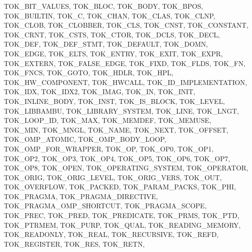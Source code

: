 T\+O\+K\+\_\+\+B\+I\+T\+\_\+\+V\+A\+L\+U\+ES, T\+O\+K\+\_\+\+B\+L\+OC, T\+O\+K\+\_\+\+B\+O\+DY, T\+O\+K\+\_\+\+B\+P\+OS, T\+O\+K\+\_\+\+B\+U\+I\+L\+T\+IN, T\+O\+K\+\_\+C, T\+O\+K\+\_\+\+C\+H\+AN, T\+O\+K\+\_\+\+C\+L\+AS, T\+O\+K\+\_\+\+C\+L\+NP, T\+O\+K\+\_\+\+C\+L\+OB, T\+O\+K\+\_\+\+C\+L\+O\+B\+B\+ER, T\+O\+K\+\_\+\+C\+LS, T\+O\+K\+\_\+\+C\+N\+ST, T\+O\+K\+\_\+\+C\+O\+N\+S\+T\+A\+NT, T\+O\+K\+\_\+\+C\+R\+NT, T\+O\+K\+\_\+\+C\+S\+TS, T\+O\+K\+\_\+\+C\+T\+OR, T\+O\+K\+\_\+\+D\+C\+LS, T\+O\+K\+\_\+\+D\+E\+CL, T\+O\+K\+\_\+\+D\+EF, T\+O\+K\+\_\+\+D\+E\+F\+\_\+\+S\+T\+MT, T\+O\+K\+\_\+\+D\+E\+F\+A\+U\+LT, T\+O\+K\+\_\+\+D\+O\+MN, T\+O\+K\+\_\+\+E\+D\+GE, T\+O\+K\+\_\+\+E\+L\+TS, T\+O\+K\+\_\+\+E\+N\+T\+RY, T\+O\+K\+\_\+\+E\+X\+IT, T\+O\+K\+\_\+\+E\+X\+PR, T\+O\+K\+\_\+\+E\+X\+T\+E\+RN, T\+O\+K\+\_\+\+F\+A\+L\+S\+E\+\_\+\+E\+D\+GE, T\+O\+K\+\_\+\+F\+I\+XD, T\+O\+K\+\_\+\+F\+L\+DS, T\+O\+K\+\_\+\+FN, T\+O\+K\+\_\+\+F\+N\+CS, T\+O\+K\+\_\+\+G\+O\+TO, T\+O\+K\+\_\+\+H\+D\+LR, T\+O\+K\+\_\+\+H\+PL, T\+O\+K\+\_\+\+H\+W\+\_\+\+C\+O\+M\+P\+O\+N\+E\+NT, T\+O\+K\+\_\+\+H\+W\+C\+A\+LL, T\+O\+K\+\_\+\+I\+D\+\_\+\+I\+M\+P\+L\+E\+M\+E\+N\+T\+A\+T\+I\+ON, T\+O\+K\+\_\+\+I\+DX, T\+O\+K\+\_\+\+I\+D\+X2, T\+O\+K\+\_\+\+I\+M\+AG, T\+O\+K\+\_\+\+IN, T\+O\+K\+\_\+\+I\+N\+IT, T\+O\+K\+\_\+\+I\+N\+L\+I\+N\+E\+\_\+\+B\+O\+DY, T\+O\+K\+\_\+\+I\+N\+ST, T\+O\+K\+\_\+\+I\+S\+\_\+\+B\+L\+O\+CK, T\+O\+K\+\_\+\+L\+E\+V\+EL, T\+O\+K\+\_\+\+L\+I\+B\+B\+A\+M\+BU, T\+O\+K\+\_\+\+L\+I\+B\+R\+A\+R\+Y\+\_\+\+S\+Y\+S\+T\+EM, T\+O\+K\+\_\+\+L\+I\+NE, T\+O\+K\+\_\+\+L\+N\+GT, T\+O\+K\+\_\+\+L\+O\+O\+P\+\_\+\+ID, T\+O\+K\+\_\+\+M\+AX, T\+O\+K\+\_\+\+M\+E\+M\+D\+EF, T\+O\+K\+\_\+\+M\+E\+M\+U\+SE, T\+O\+K\+\_\+\+M\+IN, T\+O\+K\+\_\+\+M\+N\+GL, T\+O\+K\+\_\+\+N\+A\+ME, T\+O\+K\+\_\+\+N\+E\+XT, T\+O\+K\+\_\+\+O\+F\+F\+S\+ET, T\+O\+K\+\_\+\+O\+M\+P\+\_\+\+A\+T\+O\+M\+IC, T\+O\+K\+\_\+\+O\+M\+P\+\_\+\+B\+O\+D\+Y\+\_\+\+L\+O\+OP, T\+O\+K\+\_\+\+O\+M\+P\+\_\+\+F\+O\+R\+\_\+\+W\+R\+A\+P\+P\+ER, T\+O\+K\+\_\+\+OP, T\+O\+K\+\_\+\+O\+P0, T\+O\+K\+\_\+\+O\+P1, T\+O\+K\+\_\+\+O\+P2, T\+O\+K\+\_\+\+O\+P3, T\+O\+K\+\_\+\+O\+P4, T\+O\+K\+\_\+\+O\+P5, T\+O\+K\+\_\+\+O\+P6, T\+O\+K\+\_\+\+O\+P7, T\+O\+K\+\_\+\+O\+P8, T\+O\+K\+\_\+\+O\+P\+EN, T\+O\+K\+\_\+\+O\+P\+E\+R\+A\+T\+I\+N\+G\+\_\+\+S\+Y\+S\+T\+EM, T\+O\+K\+\_\+\+O\+P\+E\+R\+A\+T\+OR, T\+O\+K\+\_\+\+O\+R\+IG, T\+O\+K\+\_\+\+O\+R\+I\+G\+\_\+\+L\+E\+V\+EL, T\+O\+K\+\_\+\+O\+R\+I\+G\+\_\+\+V\+E\+RS, T\+O\+K\+\_\+\+O\+UT, T\+O\+K\+\_\+\+O\+V\+E\+R\+F\+L\+OW, T\+O\+K\+\_\+\+P\+A\+C\+K\+ED, T\+O\+K\+\_\+\+P\+A\+R\+A\+M\+\_\+\+P\+A\+C\+KS, T\+O\+K\+\_\+\+P\+HI, T\+O\+K\+\_\+\+P\+R\+A\+G\+MA, T\+O\+K\+\_\+\+P\+R\+A\+G\+M\+A\+\_\+\+D\+I\+R\+E\+C\+T\+I\+VE, T\+O\+K\+\_\+\+P\+R\+A\+G\+M\+A\+\_\+\+O\+M\+P\+\_\+\+S\+H\+O\+R\+T\+C\+UT, T\+O\+K\+\_\+\+P\+R\+A\+G\+M\+A\+\_\+\+S\+C\+O\+PE, T\+O\+K\+\_\+\+P\+R\+EC, T\+O\+K\+\_\+\+P\+R\+ED, T\+O\+K\+\_\+\+P\+R\+E\+D\+I\+C\+A\+TE, T\+O\+K\+\_\+\+P\+R\+MS, T\+O\+K\+\_\+\+P\+TD, T\+O\+K\+\_\+\+P\+T\+R\+M\+EM, T\+O\+K\+\_\+\+P\+U\+RP, T\+O\+K\+\_\+\+Q\+U\+AL, T\+O\+K\+\_\+\+R\+E\+A\+D\+I\+N\+G\+\_\+\+M\+E\+M\+O\+RY, T\+O\+K\+\_\+\+R\+E\+A\+D\+O\+N\+LY, T\+O\+K\+\_\+\+R\+E\+AL, T\+O\+K\+\_\+\+R\+E\+C\+U\+R\+S\+I\+VE, T\+O\+K\+\_\+\+R\+E\+FD, T\+O\+K\+\_\+\+R\+E\+G\+I\+S\+T\+ER, T\+O\+K\+\_\+\+R\+ES, T\+O\+K\+\_\+\+R\+E\+TN, 